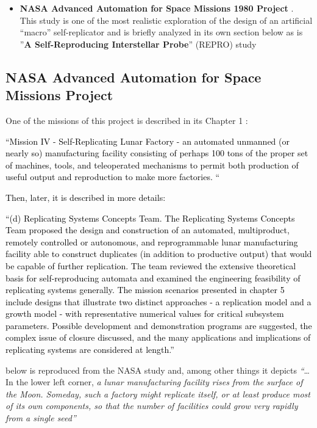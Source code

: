 \bigskip

\begin{itemize}
\item \textbf{NASA Advanced Automation for Space Missions 1980 Project}
. This study is one of the most realistic exploration of the design of
an artificial “macro” self-replicator and is briefly analyzed in its
own section below as is ”\textbf{A Self-Reproducing Interstellar
Probe}” (REPRO) study 
\end{itemize}

\bigskip

\subsection[NASA Advanced Automation for Space Missions Project]{NASA
Advanced Automation for Space Missions Project}
\hypertarget{RefHeading3154306210128}{}One of the missions of this
project is described in its Chapter 1 :

\textcolor{black}{“Mission IV - Self-Replicating Lunar Factory - an
automated unmanned (or nearly so) manufacturing facility consisting of
perhaps 100 tons of the proper set of machines, tools, and teleoperated
mechanisms to permit both production of useful output and reproduction
to make more factories. “}

\textcolor{black}{Then, later, it is described in more details:}

\textcolor{black}{“(d) Replicating Systems Concepts Team. The
Replicating Systems Concepts Team proposed the design and construction
of an automated, multiproduct, remotely controlled or autonomous, and
reprogrammable lunar manufacturing facility able to construct
duplicates (in addition to productive output) that would be capable of
further replication. The team reviewed the extensive theoretical basis
for self-reproducing automata and examined the engineering feasibility
of replicating systems generally. The mission scenarios presented in
chapter 5 include designs that illustrate two distinct approaches - a
replication model and a growth model - with representative numerical
values for critical subsystem parameters. Possible development and
demonstration programs are suggested, the complex issue of closure
discussed, and the many applications and implications of replicating
systems are considered at length.” }

 below is reproduced from the NASA study and, among other things it
depicts \textit{“}…In the lower left corner, \textit{a lunar
manufacturing facility rises from the surface of the Moon. Someday,
such a factory might replicate itself, or at least produce most of its
own components, so that the number of facilities could grow very
rapidly from a single seed” }



